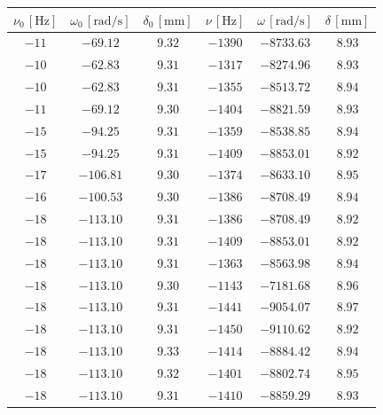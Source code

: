 \documentclass[]{article}
\begin{document}
    \begin{table}[H]
        \centering
        \begin{tabular}{||c|c|c||c|c|c||}
            \hline
            $\nu_0 \, [\text{Hz}]$ & $\omega_0 \, [\text{rad/s}]$ &  $\delta_0 \,[\text{mm}]$ &  $\nu \,[\text{Hz}]$ & $\omega \,[\text{rad/s}]$ & $\delta \, [\text{mm}]$ \\
            \hline\hline
            $-11 $ & $-69.12  $ & $ 9.32 $ & $ -1390 $ & $ -8733.63 $ & $  8.93 $ \\\hline
            $-10 $ & $-62.83  $ & $ 9.31 $ & $ -1317 $ & $ -8274.96 $ & $  8.93 $ \\\hline
            $-10 $ & $-62.83  $ & $ 9.31 $ & $ -1355 $ & $ -8513.72 $ & $  8.94 $ \\\hline
            $-11 $ & $-69.12  $ & $ 9.30 $ & $ -1404 $ & $ -8821.59 $ & $  8.93 $ \\\hline
            $-15 $ & $-94.25  $ & $ 9.31 $ & $ -1359 $ & $ -8538.85 $ & $  8.94 $ \\\hline
            $-15 $ & $-94.25  $ & $ 9.31 $ & $ -1409 $ & $ -8853.01 $ & $  8.92 $ \\\hline
            $-17 $ & $-106.81 $ & $ 9.30 $ & $ -1374 $ & $ -8633.10 $ & $  8.95 $ \\\hline
            $-16 $ & $-100.53 $ & $ 9.30 $ & $ -1386 $ & $ -8708.49 $ & $  8.94 $ \\\hline
            $-18 $ & $-113.10 $ & $ 9.31 $ & $ -1386 $ & $ -8708.49 $ & $  8.92 $ \\\hline
            $-18 $ & $-113.10 $ & $ 9.31 $ & $ -1409 $ & $ -8853.01 $ & $  8.92 $ \\\hline
            $-18 $ & $-113.10 $ & $ 9.31 $ & $ -1363 $ & $ -8563.98 $ & $  8.94 $ \\\hline
            $-18 $ & $-113.10 $ & $ 9.30 $ & $ -1143 $ & $ -7181.68 $ & $  8.96 $ \\\hline
            $-18 $ & $-113.10 $ & $ 9.31 $ & $ -1441 $ & $ -9054.07 $ & $  8.97 $ \\\hline
            $-18 $ & $-113.10 $ & $ 9.31 $ & $ -1450 $ & $ -9110.62 $ & $  8.92 $ \\\hline
            $-18 $ & $-113.10 $ & $ 9.33 $ & $ -1414 $ & $ -8884.42 $ & $  8.94 $ \\\hline
            $-18 $ & $-113.10 $ & $ 9.32 $ & $ -1401 $ & $ -8802.74 $ & $  8.95 $ \\\hline
            $-18 $ & $-113.10 $ & $ 9.31 $ & $ -1410 $ & $ -8859.29 $ & $  8.93 $ \\\hline

\end{tabular}
\end{table}
\end{document}
